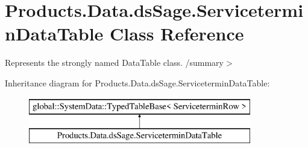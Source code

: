 \hypertarget{class_products_1_1_data_1_1ds_sage_1_1_servicetermin_data_table}{}\section{Products.\+Data.\+ds\+Sage.\+Servicetermin\+Data\+Table Class Reference}
\label{class_products_1_1_data_1_1ds_sage_1_1_servicetermin_data_table}


Represents the strongly named Data\+Table class. /summary$>$  


Inheritance diagram for Products.\+Data.\+ds\+Sage.\+Servicetermin\+Data\+Table\+:\begin{figure}[H]
\begin{center}
\leavevmode
\includegraphics[height=2.000000cm]{class_products_1_1_data_1_1ds_sage_1_1_servicetermin_data_table}
\end{center}
\end{figure}
